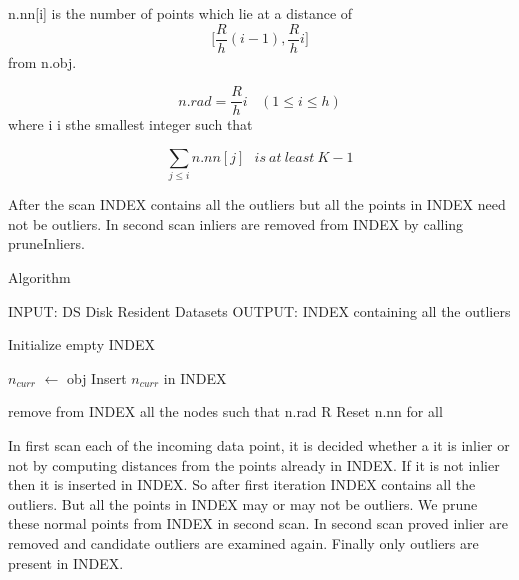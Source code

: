 n.nn[i] is the number of points which lie at a distance of  \[ \bigg[   {\frac{R}{h}} (i-1) , {\frac{R}{h} } i \bigg] \]  from n.obj.

\[  n.rad = {\frac{R}{h}} i  \ \ \ \           (1 \leq i \leq h) \]
where i i sthe smallest integer such that 

\[  \sum_{j \leq i} n.nn[j]  \ \ \      is \ at \ least \ K-1 \]



After the scan INDEX contains all the outliers but all the points in INDEX need not be outliers. In second scan inliers are removed from INDEX by calling pruneInliers.

\begin{algorithm}[H]
	\caption{Algorithm}
	\begin{algorithmic}
		\STATE  
		\STATE INPUT:  DS Disk Resident Datasets
		\STATE OUTPUT: INDEX containing all the outliers
		\STATE
		
		\STATE Initialize empty INDEX
		
		
			\STATE $n_{curr}$  $\leftarrow$ obj
				\STATE Insert $n_{curr}$ in INDEX
			\ENDIF
		
		\ENDFOR
	
	\STATE  remove from INDEX all the nodes such that n.rad  R
	\STATE  Reset n.nn for all
		
	\end{algorithmic}
\end{algorithm}

In first scan each of the incoming data point, it is decided whether a it is inlier or not by computing distances from the points already in INDEX. If it is not inlier then it is inserted in INDEX. So after first iteration INDEX contains all the outliers. But all the points in INDEX may or may not be outliers. We prune these normal points from INDEX in second scan. In second scan proved inlier are removed and candidate outliers are examined again.  Finally only outliers are present in INDEX.

